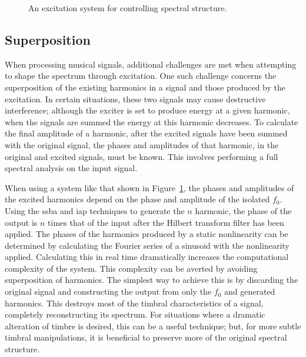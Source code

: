 \begin{figure}[h!]
			\caption{An excitation system for controlling spectral structure.}
			\label{fig:SpectralShapingSystem}
		\end{figure}

	\subsection{Superposition}
	\label{sec:FeatureControl-Systems-Superposition}
		When processing musical signals, additional challenges are met when attempting to shape the spectrum
		through excitation. One such challenge concerns the superposition of the existing harmonics in a signal and
		those produced by the excitation. In certain situations, these two signals may cause destructive
		interference; although the exciter is set to produce energy at a given harmonic, when the signals are
		summed the energy at this harmonic decreases. To calculate the final amplitude of a harmonic, after the
		excited signals have been summed with the original signal, the phases and amplitudes of that harmonic, in
		the original and excited signals, must be known. This involves performing a full spectral analysis on the
		input signal. 

		When using a system like that shown in Figure~\ref{fig:SpectralShapingSystem}, the phases and amplitudes of
		the excited harmonics depend on the phase and amplitude of the isolated $f_{0}$. Using the \acrshort{ssba}
		and \acrshort{iap} techniques to generate the $n$ harmonic, the phase of the output is $n$ times
		that of the input after the Hilbert transform filter has been applied. The phases of the harmonics produced
		by a static nonlinearity can be determined by calculating the Fourier series of a sinusoid with the
		nonlinearity applied. Calculating this in real time dramatically increases the computational complexity of
		the system.  This complexity can be averted by avoiding superposition of harmonics. The simplest way to
		achieve this is by discarding the original signal and constructing the output from only the $f_{0}$ and
		generated harmonics.  This destroys most of the timbral characteristics of a signal, completely
		reconstructing its spectrum. For situations where a dramatic alteration of timbre is desired, this can be a
		useful technique; but, for more subtle timbral manipulations, it is beneficial to preserve more of the
		original spectral structure.

